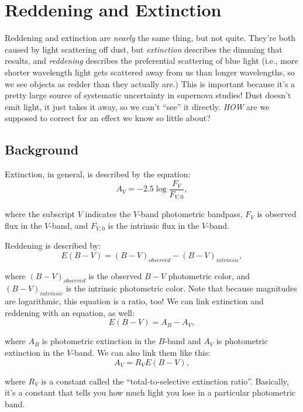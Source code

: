 \section{Reddening and Extinction}

Reddening and extinction are \textit{nearly} the same thing, but not quite. They're both caused by light scattering off dust, but \textit{extinction} describes the dimming that results, and \textit{reddening} describes the preferential scattering of blue light (i.e., more shorter wavelength light gets scattered away from us than longer wavelengths, so we see objects as redder than they actually are.) This is important because it's a pretty large source of systematic uncertainty in supernova studies! Dust doesn't emit light, it just takes it away, so we can't ``see'' it directly. \textit{HOW} are we supposed to correct for an effect we know so little about? 

\subsection{Background}
Extinction, in general, is described by the equation:
\begin{equation}
    A_{V} = -2.5\log \frac{F_{V}}{F_{V,0}},
\end{equation}

where the subscript $V$ indicates the $V$-band photometric bandpass, $F_{V}$ is observed flux in the $V$-band, and $F_{V, 0}$ is the intrinsic flux in the $V$-band.

Reddening is described by:
\begin{equation}
    E(B-V) = (B-V)_{observed} - (B-V)_{intrinsic},
\end{equation}

where $(B-V)_{observed}$ is the observed $B-V$ photometric color, and $(B-V)_{intrinsic}$ is the intrinsic photometric color. Note that because magnitudes are logarithmic, this equation is a ratio, too! We can link extinction and reddening with an equation, as well:
\begin{equation}
    E(B-V) = A_{B} - A_{V},
\end{equation}

where $A_{B}$ is photometric extinction in the $B$-band and $A_{V}$ is photometric extinction in the $V$-band. We can also link them like this:
\begin{equation}
    A_{V} = R_{V}E(B-V),
\end{equation}

where $R_{V}$ is a constant called the ``total-to-selective extinction ratio''. Basically, it's a constant that tells you how much light you lose in a particular photometric band. 

